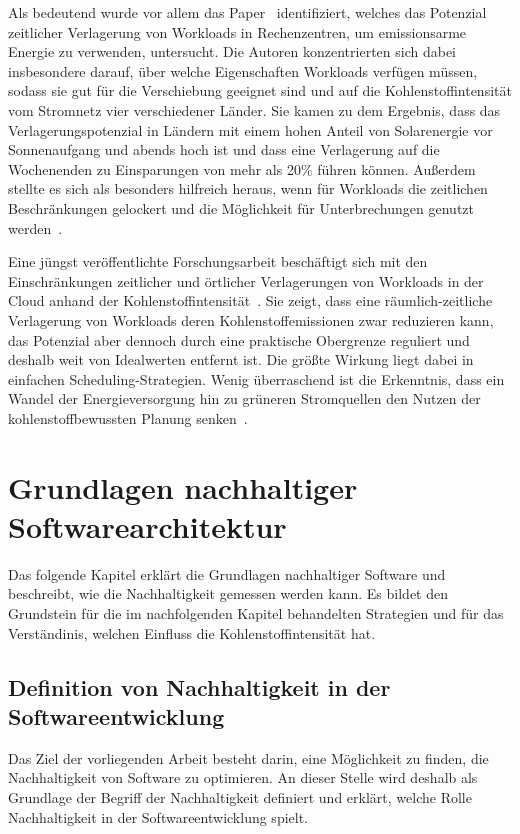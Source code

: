 Als bedeutend wurde vor allem das Paper~\cite{Wiesner.2021} identifiziert, welches das Potenzial zeitlicher Verlagerung von Workloads in Rechenzentren, um emissionsarme Energie zu verwenden, untersucht.
Die Autoren konzentrierten sich dabei insbesondere darauf, über welche Eigenschaften Workloads verfügen müssen, sodass sie gut für die Verschiebung geeignet sind und auf die Kohlenstoffintensität vom Stromnetz vier verschiedener Länder.
Sie kamen zu dem Ergebnis, dass das Verlagerungspotenzial in Ländern mit einem hohen Anteil von Solarenergie vor Sonnenaufgang und abends hoch ist und dass eine Verlagerung auf die Wochenenden zu Einsparungen von mehr als 20\% führen können.
Außerdem stellte es sich als besonders hilfreich heraus, wenn für Workloads die zeitlichen Beschränkungen gelockert und die Möglichkeit für Unterbrechungen genutzt werden~\cite{Wiesner.2021}.

Eine jüngst veröffentlichte Forschungsarbeit beschäftigt sich mit den Einschränkungen zeitlicher und örtlicher Verlagerungen von Workloads in der Cloud anhand der Kohlenstoffintensität~\cite{Sukprasert.2023}.
Sie zeigt, dass eine räumlich-zeitliche Verlagerung von Workloads deren Kohlenstoffemissionen zwar reduzieren kann, das Potenzial aber dennoch durch eine praktische Obergrenze reguliert und deshalb weit von Idealwerten entfernt ist.
Die größte Wirkung liegt dabei in einfachen Scheduling-Strategien.
Wenig überraschend ist die Erkenntnis, dass ein Wandel der Energieversorgung hin zu \glqq grüneren\grqq{} Stromquellen den Nutzen der kohlenstoffbewussten Planung senken~\cite{Sukprasert.2023}.
\chapter{Grundlagen nachhaltiger Softwarearchitektur}
Das folgende Kapitel erklärt die Grundlagen nachhaltiger Software und beschreibt, wie die Nachhaltigkeit gemessen werden kann.
Es bildet den Grundstein für die im nachfolgenden Kapitel behandelten Strategien und für das Verständinis, welchen Einfluss die Kohlenstoffintensität hat.
\section{Definition von Nachhaltigkeit in der Softwareentwicklung}
Das Ziel der vorliegenden Arbeit besteht darin, eine Möglichkeit zu finden, die Nachhaltigkeit von Software zu optimieren.
An dieser Stelle wird deshalb als Grundlage der Begriff der Nachhaltigkeit definiert und erklärt, welche Rolle Nachhaltigkeit in der Softwareentwicklung spielt.

